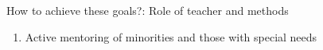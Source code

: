 \begin{frame}{How to achieve these goals?: Role of teacher \alert{and methods}}
\begin{enumerate}
\begin{itemize}[<+->]
		\end{itemize}
		\item Active mentoring of minorities and those with special needs
	\end{enumerate}
\end{frame}

